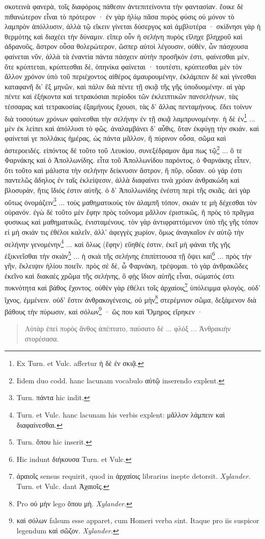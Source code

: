 \documentclass[a4paper, 11pt, oneside, polutonikogreek, german]{article}
\begin{document}
σκοτεινὰ φανερὰ, τοῖς διαφόροις πάθεσιν ἀντεπιτείνοντα τὴν φαντασίαν. ἔοικε δὲ πιθανώτερον εἶναι τὸ πρότερον · ἐν γὰρ ἡλίῳ πᾶσα πυρὸς φύσις οὐ μόνον τὸ λαμπρὸν ἀπόλλυσιν, ἀλλὰ τῷ εἴκειν γίνεται δύσεργος καὶ ἀμβλυτέρα · σκίδνησι γὰρ ἡ θερμότης καὶ διαχέει τὴν δύναμιν. εἴπερ οὖν ἡ σελήνη πυρὸς εἴληχε βληχροῦ καὶ ἀδρανοῦς, ἄστρον οὖσα θολερώτερον, ὥσπερ αὐτοὶ λέγουσιν, οὐθὲν, ὧν πάσχουσα φαίνεται νῦν, ἀλλὰ τὰ ἐναντία πάντα πάσχειν αὐτὴν προσῆκόν ἐστι, φαίνεσθαι μὲν, ὅτε κρύπτεται, κρύπτεσθαι δὲ, ὁπηνίκα φαίνεται · τουτέστι, κρύπτεσθαι μὲν τὸν ἄλλον χρόνον ὑπὸ τοῦ περιέχοντος αἰθέρος ἀμαυρουμένην, ἐκλάμπειν δὲ καὶ γίνεσθαι καταφανῆ δι' ἓξ μηνῶν, καὶ πάλιν διὰ πέντε τῇ σκιᾷ τῆς γῆς ὑποδυομένην. αἱ γὰρ πέντε καὶ ἑξήκοντα καὶ τετρακόσιαι περίοδοι τῶν ἐκλειπτικῶν πανσελήνων, τὰς τέσσαρας καὶ τετρακοσίας ἑξαμήνους ἔχουσι, τὰς δ' ἄλλας πενταμήνους. ἔδει τοίνυν διὰ τοσούτων χρόνων φαίνεσθαι τὴν σελήνην ἐν τῇ σκιᾷ λαμπρυνομένην. ἡ δὲ ἐν\footnote{Ex Turn. et Vulc. affertur ἡ δὲ ἐν σκιᾷ.} ... μὲν ἐκ λείπει καὶ ἀπόλλυσι τὸ φῶς. ἀναλαμβάνει δ' αὖθις, ὅταν ἐκφύγῃ τὴν σκιάν. καὶ φαίνεταί γε πολλάκις ἡμέρας, ὡς πάντα μᾶλλον, ἢ πύρινον οὖσα, σῶμα καὶ ἀστεροειδές. εἰπόντος δὲ τοῦτο τοῦ Λευκίου, συνεξέδραμον ἅμα πως τῷ\footnote{Iidem duo codd. hanc lacunam vocabulo αὐτῷ inserendo explent.} ... ὅ τε Φαρνάκης καὶ ὁ Ἀπολλωνίδης. εἶτα τοῦ Ἀπολλωνίδου παρόντος, ὁ Φαρνάκης εἶπεν, ὅτι τοῦτο καὶ μάλιστα τὴν σελήνην δείκνυσιν ἄστρον, ἢ πῦρ, οὖσαν. οὐ γάρ ἐστι παντελῶς ἄδηλος ἐν ταῖς ἐκλείψεσιν, ἀλλὰ διαφαίνει τινὰ χρόαν ἀνθρακώδη καὶ βλοσυρὰν, ἥτις ἴδιός ἐστιν αὐτῆς. ὁ δ' Ἀπολλωνίδης ἐνέστη περὶ τῆς σκιᾶς. ἀεὶ γὰρ οὕτως ὀνομάζειν\footnote{Turn. πάντα hic indit.} ... τοὺς μαθηματικοὺς τὸν ἀλαμπῆ τόπον, σκιάν τε μὴ δέχεσθαι τὸν οὐρανόν. ἐγὼ δὲ τοῦτο μὲν ἔφην πρὸς τοὔνομα μᾶλλον ἐριστικῶς, ἢ πρὸς τὸ πρᾶγμα φυσικως καὶ μαθηματικῶς, ἐνισταμένους. τὸν γὰρ ἀντιφραττόμενον ὑπὸ τῆς γῆς τόπον εἰ μὴ σκιάν τις ἐθέλοι καλεῖν, ἀλλ' ἀφεγγὲς χωρίον, ὅμως ἀναγκαῖον ἐν αὐτῷ τὴν σελήνην γενομένην\footnote{Turn. et Vulc. hanc lacunam his verbis explent: μᾶλλον λάμπειν καὶ διαφαίνεσθαι.} ... καὶ ὅλως (ἔφην) εὔηθές ἐστιν, ἐκεῖ μὴ φάναι τῆς γῆς ἐξικνεῖσθαι τὴν σκιὰν\footnote{Turn. ὅπου hic inserit.} ... ἡ σκιὰ τῆς σελήνης ἐπιπίπτουσα τῇ ὄψει καὶ\footnote{Hic indunt διήκουσα Turn. et Vulc.} ... πρὸς τὴν γῆν, ἔκλειψιν ἡλίου ποιεῖν. πρὸς σὲ δὲ, ὦ Φαρνάκη, τρέψομαι. τὸ γὰρ ἀνθρακῶδες ἐκεῖνο καὶ διακαὲς χρῶμα τῆς σελήνης, ὃ φῂς ἴδιον αὐτῆς εἶναι, σώματός ἐστι πυκνότητα καὶ βάθος ἔχοντος. οὐθὲν γὰρ ἐθέλει τοῖς ἀρχαίοις\footnote{ἀραιοῖς sensus requirit, quod in ἀρχαίοις librarius inepte detorsit. \emph{Xylander.} Turn. et Vulc. dant Ἀχαιοῖς.} ὑπόλειμμα φλογὸς, οὐδ' ἴχνος, ἐμμένειν. οὐδ' ἔστιν ἀνθρακογένεσις, οὐ μὴν\footnote{Pro οὐ μὴν lego ὅπου μὴ. \emph{Xylander.}} στερέμνιον σῶμα, δεξάμενον διὰ βάθους τὴν πύρωσιν, καὶ σόλων\footnote{καὶ σόλων falsum esse apparet, cum Homeri verba sint. Itaque pro iis suspicor legendum καὶ σῶζον. \emph{Xylander.}} · ὥς που καὶ Ὅμηρος εἴρηκεν ·
\begin{quotation}\small
Αὐτὰρ ἐπεὶ πυρὸς ἄνθος ἀπέπτατο, παύσατο δὲ ... φλόξ ... Ἀνθρακιὴν στορέσασα.
\end{quotation}
\end{document}
